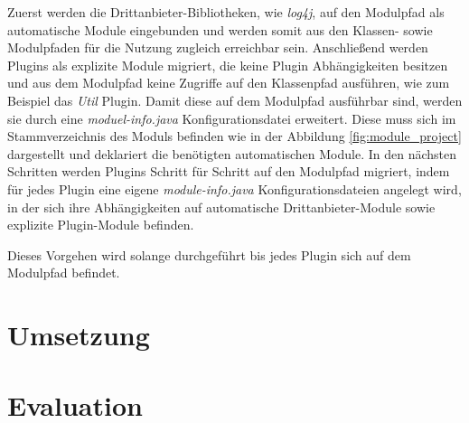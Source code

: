 Zuerst werden die Drittanbieter-Bibliotheken, wie \textit{log4j}, auf den Modulpfad als automatische Module eingebunden und werden somit aus den Klassen- sowie Modulpfaden für die Nutzung zugleich erreichbar sein. Anschließend werden Plugins als explizite Module migriert, die keine Plugin Abhängigkeiten besitzen und aus dem Modulpfad keine Zugriffe auf den Klassenpfad ausführen, wie zum Beispiel das \textit{Util} Plugin. 
Damit diese auf dem Modulpfad ausführbar sind, werden sie durch eine \textit{moduel-info.java} Konfigurationsdatei erweitert. Diese muss sich im Stammverzeichnis des Moduls befinden wie in der Abbildung \ref{fig:module_project} dargestellt und deklariert die benötigten automatischen Module. In den nächsten Schritten werden Plugins Schritt für Schritt auf den Modulpfad migriert, indem für jedes Plugin eine eigene \textit{module-info.java} Konfigurationsdateien angelegt wird, in der sich ihre Abhängigkeiten auf automatische Drittanbieter-Module sowie explizite Plugin-Module befinden.


Dieses Vorgehen wird solange durchgeführt bis jedes Plugin sich auf dem Modulpfad befindet. 


\section{Umsetzung}
 



\section{Evaluation}




